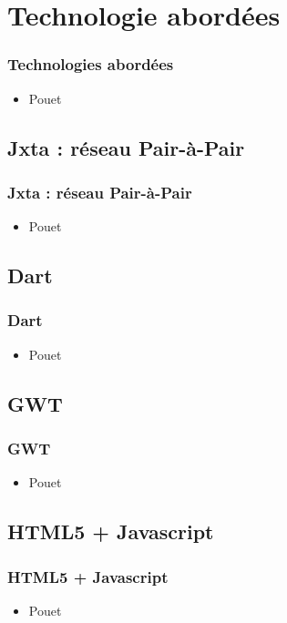 \section{Technologie abordées}
  \begin{frame}
    \frametitle{Technologies abordées}
    \begin{itemize}
      \item Pouet
    \end{itemize}
  \end{frame}

  \subsection*{Jxta : réseau Pair-à-Pair}
    \begin{frame}
      \frametitle{Jxta : réseau Pair-à-Pair}
      \begin{itemize}
        \item Pouet
      \end{itemize}
    \end{frame}

  \subsection*{Dart}
    \begin{frame}
      \frametitle{Dart}
      \begin{itemize}
        \item Pouet
      \end{itemize}
    \end{frame}

  \subsection*{GWT}
    \begin{frame}
      \frametitle{GWT}
      \begin{itemize}
        \item Pouet
      \end{itemize}
    \end{frame}

  \subsection*{HTML5 + Javascript}
    \begin{frame}
      \frametitle{HTML5 + Javascript}
      \begin{itemize}
        \item Pouet
      \end{itemize}
    \end{frame}

